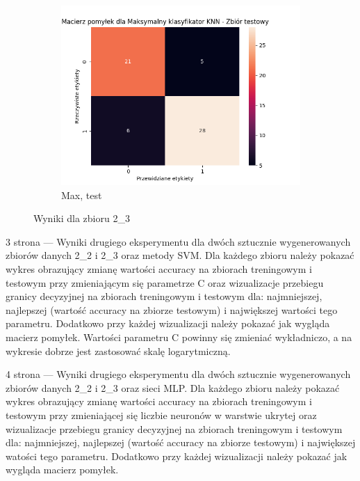 \documentclass[12pt]{article}
\newcommand*{\subfigwidth}{0.24\textwidth}
\begin{document}
\begin{figure}[H]
\begin{subfigure}[t]{\subfigwidth}
        \includegraphics[width=\linewidth]{img/exp_2/knn/2_3/max/test_matrix.png}
        \caption{Max, test}
    \end{subfigure} 
    
    \caption{Wyniki dla zbioru 2\_3}
\end{figure}


\clearpage

3 strona --- Wyniki drugiego eksperymentu dla dwóch sztucznie wygenerowanych zbiorów danych 2\_2 i 2\_3 oraz metody SVM. Dla każdego zbioru należy pokazać wykres obrazujący zmianę wartości accuracy na zbiorach treningowym i testowym przy zmieniającym się parametrze C oraz wizualizacje przebiegu granicy decyzyjnej na zbiorach treningowym i testowym dla: najmniejszej, najlepszej (wartość accuracy na zbiorze testowym) i największej wartości tego parametru. Dodatkowo przy każdej wizualizacji należy pokazać jak wygląda macierz pomyłek. Wartości parametru C powinny się zmieniać wykładniczo, a na wykresie dobrze jest zastosować skalę logarytmiczną. 

\clearpage

4 strona --- Wyniki drugiego eksperymentu dla dwóch sztucznie wygenerowanych zbiorów danych 2\_2 i 2\_3 oraz sieci MLP. Dla każdego zbioru należy pokazać wykres obrazujący zmianę wartości accuracy na zbiorach treningowym i testowym przy zmieniającej się liczbie neuronów w warstwie ukrytej oraz wizualizacje przebiegu granicy decyzyjnej na zbiorach treningowym i testowym dla: najmniejszej, najlepszej (wartość accuracy na zbiorze testowym) i największej watości tego parametru. Dodatkowo przy każdej wizualizacji należy pokazać jak wygląda macierz pomyłek.
\end{document}
